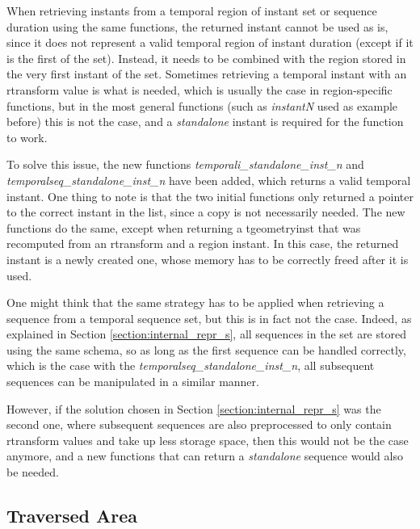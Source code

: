 When retrieving instants from a temporal region of instant set or sequence duration using the same functions, the returned instant cannot be used as is, since it does not represent a valid temporal region of instant duration (except if it is the first of the set). Instead, it needs to be combined with the region stored in the very first instant of the set. Sometimes retrieving a temporal instant with an rtransform value is what is needed, which is usually the case in region-specific functions, but in the most general functions (such as \textit{instantN} used as example before) this is not the case, and a \textit{standalone} instant is required for the function to work.

To solve this issue, the new functions \textit{temporali\_standalone\_inst\_n} and \textit{temporalseq\_standalone\_inst\_n} have been added, which returns a valid temporal instant. One thing to note is that the two initial functions only returned a pointer to the correct instant in the list, since a copy is not necessarily needed. The new functions do the same, except when returning a tgeometryinst that was recomputed from an rtransform and a region instant. In this case, the returned instant is a newly created one, whose memory has to be correctly freed after it is used.


One might think that the same strategy has to be applied when retrieving a sequence from a temporal sequence set, but this is in fact not the case. Indeed, as explained in Section \ref{section:internal_repr_s}, all sequences in the set are stored using the same schema, so as long as the first sequence can be handled correctly, which is the case with the \textit{temporalseq\_standalone\_inst\_n}, all subsequent sequences can be manipulated in a similar manner.

However, if the solution chosen in Section \ref{section:internal_repr_s} was the second one, where subsequent sequences are also preprocessed to only contain rtransform values and take up less storage space, then this would not be the case anymore, and a new functions that can return a \textit{standalone} sequence would also be needed.

\subsection{Traversed Area}
\label{section:traversed_area}

